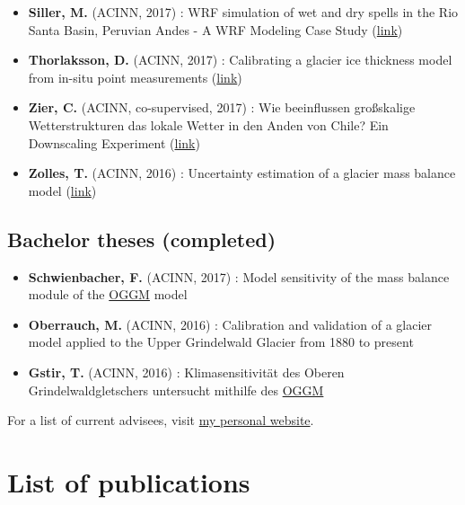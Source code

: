 \begin{itemize}[nosep]
\item {} 
\textbf{Siller, M.} (ACINN, 2017)
: WRF simulation of wet and dry spells in the Rio Santa Basin, Peruvian Andes - A WRF Modeling Case Study (\href{http://diglib.uibk.ac.at/urn:nbn:at:at-ubi:1-7816}{link})

\item {} 
\textbf{Thorlaksson, D.} (ACINN, 2017)
: Calibrating a glacier ice thickness model from in-situ point measurements (\href{http://diglib.uibk.ac.at/urn:nbn:at:at-ubi:1-7259}{link})

\item {} 
\textbf{Zier, C.} (ACINN, co-supervised, 2017)
: Wie beeinflussen großskalige Wetterstrukturen das lokale Wetter in den Anden von Chile? Ein Downscaling Experiment (\href{http://diglib.uibk.ac.at/urn:nbn:at:at-ubi:1-7092}{link})

\item {} 
\textbf{Zolles, T.} (ACINN, 2016)
: Uncertainty estimation of a glacier mass balance model (\href{http://diglib.uibk.ac.at/urn:nbn:at:at-ubi:1-5240}{link})

\end{itemize}


\subsection*{Bachelor theses (completed)}
\label{\detokenize{ch08/cv:bachelor-theses-completed}}\begin{itemize}[nosep]
\item {} 
\textbf{Schwienbacher, F.} (ACINN, 2017)
: Model sensitivity of the mass balance module of the \href{http://oggm.org/}{OGGM} model

\item {} 
\textbf{Oberrauch, M.} (ACINN, 2016)
: Calibration and validation of a glacier model applied to the Upper Grindelwald Glacier from 1880 to present

\item {} 
\textbf{Gstir, T.}  (ACINN, 2016)
: Klimasensitivität des Oberen Grindelwaldgletschers untersucht mithilfe des \href{http://oggm.org}{OGGM}

\end{itemize}

For a list of current advisees, visit \href{https://fabienmaussion.info/team/}{my personal website}.


\section*{List of publications}

